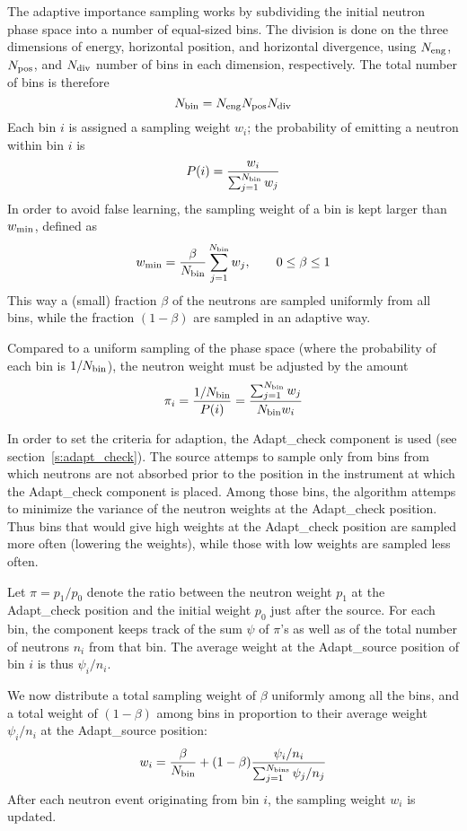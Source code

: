 The adaptive importance sampling works by subdividing the initial
neutron phase space into a number of equal-sized bins. The division is
done on the three dimensions of energy, horizontal position, and
horizontal divergence, using $N_{\rm eng}$, $N_{\rm pos}$, and $N_{\rm
  div}$ number of bins in each dimension, respectively. The total number
of bins is therefore
$$
N_{\rm bin} = N_{\rm eng} N_{\rm pos} N_{\rm div}
$$
Each bin $i$ is assigned a sampling weight $w_i$; the probability of
emitting a neutron within bin $i$ is
$$
P(i) = \frac{w_i}{\sum_{j=1}^{N_{\rm bin}} w_j}
$$
In order to avoid false learning, the sampling weight of a bin is
kept larger than $w_{\rm min}$, defined as
$$
w_{\rm min} = \frac{\beta}{N_{\rm bin}}\sum_{j=1}^{N_{\rm bin}}w_j,\qquad
    0 \leq \beta \leq 1
$$
This way a (small) fraction $\beta$ of the neutrons are sampled
uniformly from all bins, while the fraction $(1 - \beta)$ are sampled in an adaptive way.

Compared to a uniform sampling of the phase space (where the probability
of each bin is $1/N_{\rm bin}$), the neutron weight
must be adjusted by the amount
$$
\pi_i = \frac{1/N_{\rm bin}}{P(i)} =
    \frac{\sum_{j=1}^{N_{\rm bin}} w_j}{N_{\rm bin} w_i}
$$

In order to set the criteria for adaption, the Adapt\_check component is
used (see section~\ref{s:adapt_check}). The source attemps to sample
only from bins from which neutrons are not absorbed prior to the
position in the instrument at which the Adapt\_check component is
placed. Among those bins, the algorithm attemps to minimize the variance
of the neutron weights at the Adapt\_check position. Thus bins that
would give high weights at the Adapt\_check position are sampled more
often (lowering the weights), while those with low weights are sampled
less often.

Let $\pi = p_1/p_0$ denote the ratio between the neutron weight $p_1$ at
the Adapt\_check position and the initial weight $p_0$ just after the
source. For each bin, the component keeps track of the sum $\psi$ of
$\pi$'s as well as of the total number of neutrons $n_i$ from that
bin. The average weight at the Adapt\_source position of bin $i$ is thus
$\psi_i/n_i$.

We now distribute a total sampling weight of $\beta$ uniformly
among all the bins, and a total weight of $(1 - \beta)$ among bins in
proportion to their average weight $\psi_i/n_i$ at the Adapt\_source
position:
$$
w_i = \frac{\beta}{N_{\rm bin}} + 
    (1-\beta) \frac{\psi_i/n_i}{\sum_{j=1}^{N_{\rm bins}} \psi_j/n_j}
$$
After each neutron event originating from bin $i$, the sampling weight $w_i$
is updated.

